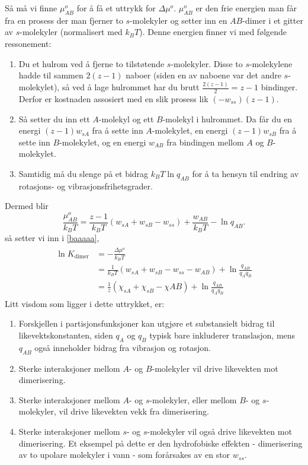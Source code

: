 Så må vi finne $\mu_{AB}^o$ for å få et uttrykk for $\Delta \mu^o$. $\mu_{AB}^o$ er den frie energien man får fra en prosess der man fjerner to $s$-molekyler og setter inn en $AB$-dimer i et gitter av $s$-molekyler (normalisert med $k_BT$). Denne energien finner vi med følgende ressonement: 
\begin{enumerate}
	\item Du et hulrom ved å fjerne to tilstøtende $s$-molekyler. Disse to $s$-molekylene hadde til sammen $2(z-1)$ naboer (siden en av naboene var det andre $s$-molekylet), så ved å lage hulrommet har du brutt $\frac{2(z-1)}{2}=z-1$ bindinger. Derfor er kostnaden assosiert med en slik prosess lik $(-w_{ss})(z-1)$.
	\item Så setter du inn ett $A$-molekyl og ett $B$-molekyl i hulrommet. Da får du en energi $(z-1)w_{sA}$ fra å sette inn $A$-molekylet, en energi $(z-1)w_{sB}$ fra å sette inn $B$-molekylet, og en energi $w_{AB}$ fra bindingen mellom $A$ og $B$-molekylet.
	\item Samtidig må du slenge på et bidrag $k_BT\ln q_{AB}$ for å ta hensyn til endring av rotasjons- og vibrasjonsfrihetsgrader.
\end{enumerate}
Dermed blir
\begin{equation}
	\frac{\mu_{AB}^o}{k_BT}=\frac{z-1}{k_BT}\left(w_{sA}+w_{sB}-w_{ss}\right)+\frac{w_{AB}}{k_BT}-\ln q_{AB}.
\end{equation}
så setter vi inn i \eqref{baaaaa}, 
\begin{align}
\begin{split}
	\ln K_{\text{dimer}} &= -\frac{\Delta \mu^o}{k_BT} \\
	&=\frac{1}{k_BT}(w_{sA}+w_{sB}-w_{ss}-w_{AB})+\ln\frac{q_{AB}}{q_Aq_B}\\
	&=\frac{1}{z}\left(\chi_{sA}+\chi_{sB}-\chi{AB}\right)+\ln\frac{q_{AB}}{q_Aq_B}
\end{split}
\end{align}
Litt visdom som ligger i dette uttrykket, er:
\begin{enumerate}
	\item Forskjellen i partisjonsfunksjoner kan utgjøre et substansielt bidrag til likevektskonstanten, siden $q_A$ og $q_B$ typisk bare inkluderer translasjon, mens $q_{AB}$ også inneholder bidrag fra vibrasjon og rotasjon.
	\item Sterke interaksjoner mellom $A$- og $B$-molekyler vil drive likevekten mot dimerisering.
	\item Sterke interaksjoner mellom $A$- og $s$-molekyler, eller mellom $B$- og $s$-molekyler, vil drive likevekten vekk fra dimerisering.
	\item Sterke interaksjoner mellom $s$- og $s$-molekyler vil også drive likevekten mot dimerisering. Et eksempel på dette er den hydrofobiske effekten - dimerisering av to upolare molekyler i vann - som forårsakes av en stor $w_{ss}$.
\end{enumerate}

